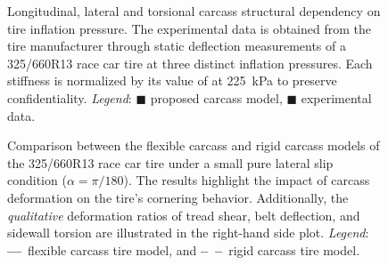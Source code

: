 \begin{figure}
  \centering
  \begin{subfigure}[c]{0.3\textwidth}
    \centering
  \end{subfigure}%
  \hfill
  \begin{subfigure}[c]{0.3\textwidth}
    \centering
  \end{subfigure}%
  \hfill
  \begin{subfigure}[c]{0.3\textwidth}
    \centering
  \end{subfigure}
  \caption{Longitudinal, lateral and torsional carcass structural dependency on tire inflation pressure. The experimental data is obtained from the tire manufacturer through static deflection measurements of a 325/660R13 race car tire at three distinct inflation pressures. Each stiffness is normalized by its value of at \SI{225}{\kilo\pascal} to preserve confidentiality. \emph{Legend}: \textcolor{mycolor1}{$\blacksquare$} proposed carcass model, \textcolor{mycolor2}{$\blacksquare$} experimental data.}
  \label{chap4:fig:racecar_stiffnesses}
\end{figure}

\begin{figure}
  \centering
  \begin{subfigure}[c]{0.3\textwidth}
  \end{subfigure}%
  \hfill
  \begin{subfigure}[c]{0.3\textwidth}
    \centering
  \end{subfigure}%
  \hfill
  \begin{subfigure}[c]{0.3\textwidth}
    \centering
  \end{subfigure}
  \caption{Comparison between the flexible carcass and rigid carcass models of the 325/660R13 race car tire under a small pure lateral slip condition ($\alpha = \pi/180$). The results highlight the impact of carcass deformation on the tire's cornering behavior. Additionally, the \emph{qualitative} deformation ratios of tread shear, belt deflection, and sidewall torsion are illustrated in the right-hand side plot. \emph{Legend}: \textbf{---}~flexible carcass tire model, and \textbf{--~--}~rigid carcass tire model.}
  \label{chap4:fig:cornering_contributions}
\end{figure}

